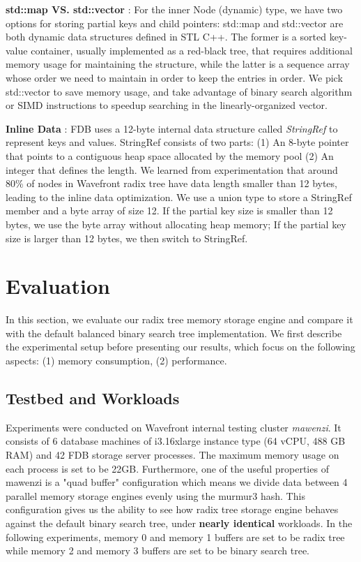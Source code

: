 \documentclass[sigplan,screen,nonacm]{acmart}
\begin{document}
\textbf {std::map VS. std::vector} : For the inner Node (dynamic) type, we have two options for storing partial keys and child pointers:  std::map and std::vector are both dynamic data structures defined in STL C++.  The former is a sorted key-value container, usually implemented as a red-black tree, that requires additional memory usage for maintaining the structure, while the latter is a sequence array whose order we need to maintain in order to keep the entries in order. We pick std::vector to save memory usage, and take advantage of binary search algorithm or SIMD instructions to speedup searching in the linearly-organized vector. 

\textbf {Inline Data} :  FDB uses a 12-byte internal data structure called {\itshape StringRef} to represent keys and values. StringRef consists of two parts: (1) An 8-byte pointer that points to a contiguous heap space allocated by the memory pool (2) An integer that defines the length. We learned from experimentation that around 80\% of nodes in Wavefront radix tree have data length smaller than 12 bytes, leading to the inline data optimization. We use a union type to store a StringRef member and a byte array of size 12. If the partial key size is smaller than 12 bytes, we use the byte array without allocating heap memory; If the partial key size is larger than 12 bytes, we then switch to StringRef. 

\section{Evaluation}
In this section, we evaluate our radix tree memory storage engine and compare it with the default balanced binary search tree implementation. We first describe the experimental setup before presenting our results, which focus on the following aspects: (1) memory consumption, (2) performance. 
 
\subsection{Testbed and Workloads}
Experiments were conducted on Wavefront internal testing cluster {\itshape mawenzi}. It consists of 6 database machines of i3.16xlarge instance type (64 vCPU, 488 GB RAM) and 42 FDB storage server processes. The maximum memory usage on each process is set to be 22GB. Furthermore, one of the useful properties of mawenzi is a "quad buffer" configuration which means we divide data between 4 parallel memory storage engines evenly using the murmur3 hash. This configuration gives us the ability to see how radix tree storage engine behaves against the default binary search tree, under \textbf {nearly identical} workloads. In the following experiments, memory 0 and memory 1 buffers are set to be radix tree while memory 2 and memory 3 buffers are set to be binary search tree. 
\end{document}
